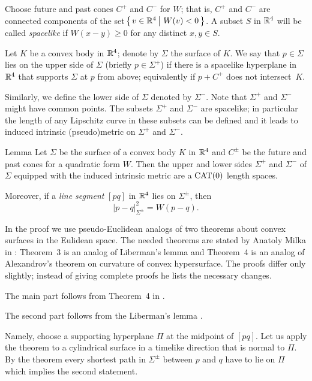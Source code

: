 \documentclass{article}
\begin{document}
Choose future and past cones $C^+$ and $C^-$ for $W$;
that is, $C^+$ and $C^-$ are connected components of the set
$\set{v\in\RR^4}{W(v)< 0}$.
A subset $S$ in $\mathbb{R}^4$ will be called \emph{spacelike} if $W(x-y)\ge 0$ for any distinct $x,y\in S$.

Let $K$ be a convex body in $\mathbb{R}^4$;
denote by $\Sigma$ the surface of $K$. 
We say that $p\in \Sigma$ lies on the upper side of $\Sigma$ (briefly $p\in\Sigma^+$) if there is a spacelike hyperplane in $\mathbb{R}^4$ that supports $\Sigma$ at $p$ from above;
equivalently if $p+C^+$ does not intersect~$K$.

Similarly, we define the lower side of $\Sigma$ denoted by $\Sigma^-$.
Note that $\Sigma^+$ and $\Sigma^-$ might have common points.
The subsets $\Sigma^+$ and $\Sigma^-$ are spacelike;
in particular the length of any Lipschitz curve in these subsets can be defined and it leads to induced intrinsic (pseudo)metric on $\Sigma^+$ and $\Sigma^-$. 

\begin{thm}{Lemma}\label{lem:sides}
Let $\Sigma$ be the surface of a convex body $K$ in $\mathbb{R}^4$ and $C^\pm$ be the future and past cones for a quadratic form $W$.
Then the upper and lower sides $\Sigma^+$ and $\Sigma^-$ of $\Sigma$ equipped with the induced intrinsic metric are a $\mathrm{CAT}(0)$ length spaces.

Moreover, if a \emph{line segment} $[pq]$ in $\mathbb{R}^4$ 
lies on $\Sigma^\pm$, then 
\[|p-q|_{\Sigma^\pm}^2=W(p-q).\]

\end{thm}

In the proof we use pseudo-Euclidean analogs of two theorems about convex surfaces in the Eulidean space.
The needed theorems are stated by Anatoly Milka in \cite{milka}:
Theorem~3 is an analog of Liberman's lemma and Theorem~4 is an analog of Alexandrov's theorem on curvature of convex hypersurface.
The proofs differ only slightly; instead of giving complete proofs he lists the necessary changes.


The main part follows from Theorem~4 in \cite[Theorem~4]{milka}.

The second part follows from the Liberman's lemma \cite[Theorem~3]{milka}.

Namely, choose a supporting hyperplane $\Pi$ at the midpoint of $[pq]$. 
Let us apply the theorem to a cylindrical surface in a timelike direction that is normal to $\Pi$.
By the theorem every shortest path in $\Sigma^\pm$ between $p$ and $q$ have to lie on $\Pi$ which implies the second statement.
\qeds
\end{document}
